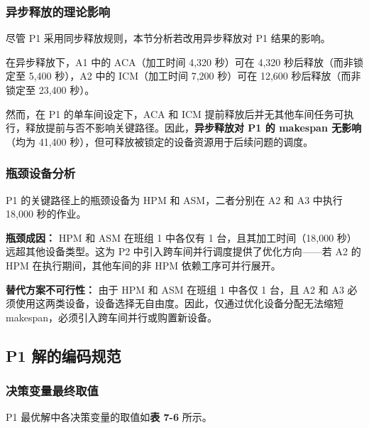 \documentclass[UTF8,a4paper,12pt]{ctexart}
\begin{document}
\subsubsection{异步释放的理论影响}
尽管 P1 采用同步释放规则，本节分析若改用异步释放对 P1 结果的影响。

在异步释放下，A1 中的 ACA（加工时间 4,320 秒）可在 4,320 秒后释放（而非锁定至 5,400 秒），A2 中的 ICM（加工时间 7,200 秒）可在 12,600 秒后释放（而非锁定至 23,400 秒）。

然而，在 P1 的单车间设定下，ACA 和 ICM 提前释放后并无其他车间任务可执行，释放提前与否不影响关键路径。因此，\textbf{异步释放对 P1 的 makespan 无影响}（均为 41,400 秒），但可释放被锁定的设备资源用于后续问题的调度。

\subsubsection{瓶颈设备分析}
P1 的关键路径上的瓶颈设备为 HPM 和 ASM，二者分别在 A2 和 A3 中执行 18,000 秒的作业。

\textbf{瓶颈成因：} HPM 和 ASM 在班组 1 中各仅有 1 台，且其加工时间（18,000 秒）远超其他设备类型。这为 P2 中引入跨车间并行调度提供了优化方向——若 A2 的 HPM 在执行期间，其他车间的非 HPM 依赖工序可并行展开。

\textbf{替代方案不可行性：} 由于 HPM 和 ASM 在班组 1 中各仅 1 台，且 A2 和 A3 必须使用这两类设备，设备选择无自由度。因此，仅通过优化设备分配无法缩短 makespan，必须引入跨车间并行或购置新设备。

\subsection{P1 解的编码规范}
\subsubsection{决策变量最终取值}
P1 最优解中各决策变量的取值如\textbf{表 7-6} 所示。
\end{document}
